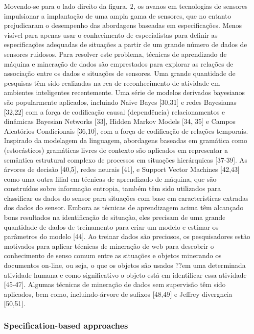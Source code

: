 \documentclass[12pt,a4paper,compsoc]{IEEEtran}
\begin{document}
Movendo-se para o lado direito da figura. 2, os avanos em tecnologias de sensores impulsionar a implantação de uma ampla gama de sensores, que no entanto prejudicaram o desempenho das abordagens baseadas em especificações. Menos visível para apenas usar o conhecimento de especialistas para definir as especificações adequadas de situações a partir de um grande número de dados de sensores ruidosos. Para resolver este problema, técnicas de aprendizado de máquina e mineração de dados são emprestados para explorar as relações de associação entre os dados e situações de sensores. Uma grande quantidade de pesquisas têm sido realizadas na rea de reconhecimento de atividade em ambientes inteligentes recentemente.
Uma série de modelos derivados bayesianos são popularmente aplicados, incluindo Naive Bayes [30,31] e redes Bayesianas [32,22] com a força de codificação causal (dependência) relacionamentos e dinâmicas Bayesian Networks [33], Hidden Markov Models [34, 35] e Campos Aleatórios Condicionais [36,10], com a força de codificação de relações temporais. Inspirado da modelagem da linguagem, abordagens baseadas em gramática como (estocásticos) gramáticas livres de contexto são aplicados em representar a semântica estrutural complexo de processos em situações hierárquicas [37-39]. As árvores de decisão [40,5], redes neurais [41], e Support Vector Machines [42,43] como uma outra filial em técnicas de aprendizado de máquina, que são construídos sobre informação entropia, também têm sido utilizados para classificar os dados do sensor para situações com base em características extradas dos dados do sensor.
Embora as técnicas de aprendizagem acima têm alcançado bons resultados na identificação de situação, eles precisam de uma grande quantidade de dados de treinamento para criar um modelo e estimar os parâmetros do modelo [44]. Ao treinar dados são preciosos, os pesquisadores estão motivados para aplicar técnicas de mineração de web para descobrir o conhecimento de senso comum entre as situações e objetos minerando os documentos on-line, ou seja, o que os objetos são usados ??em uma determinada atividade humana e como significativo o objeto está em identificar essa atividade [45-47]. Algumas técnicas de mineração de dados sem supervisão têm sido aplicados, bem como, incluindo-árvore de sufixos [48,49] e Jeffrey divergncia [50,51].

\subsubsection{Specification-based approaches}
\end{document}
